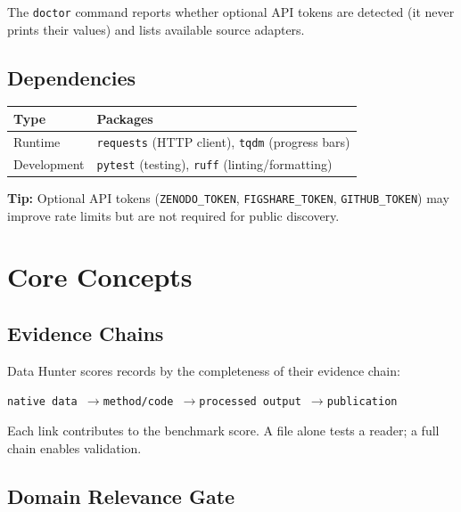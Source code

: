 \documentclass[11pt,a4paper]{article}
\begin{document}
The \texttt{doctor} command reports whether optional API tokens are detected (it never prints their values) and lists available source adapters.

\subsection*{Dependencies}

\begin{tabular}{ll}
\toprule
\textbf{Type} & \textbf{Packages} \\
\midrule
Runtime & \texttt{requests} (HTTP client), \texttt{tqdm} (progress bars) \\
Development & \texttt{pytest} (testing), \texttt{ruff} (linting/formatting) \\
\bottomrule
\end{tabular}

\bigskip
\begin{tipbox}
\textbf{Tip:} Optional API tokens (\texttt{ZENODO\_TOKEN}, \texttt{FIGSHARE\_TOKEN}, \texttt{GITHUB\_TOKEN}) may improve rate limits but are not required for public discovery.
\end{tipbox}

\section{Core Concepts}

\subsection{Evidence Chains}

Data Hunter scores records by the completeness of their evidence chain:

\begin{center}
\texttt{native data \quad$\rightarrow$\quad method/code \quad$\rightarrow$\quad processed output \quad$\rightarrow$\quad publication}
\end{center}

Each link contributes to the benchmark score. A file alone tests a reader; a full chain enables validation.

\subsection{Domain Relevance Gate}
\end{document}
